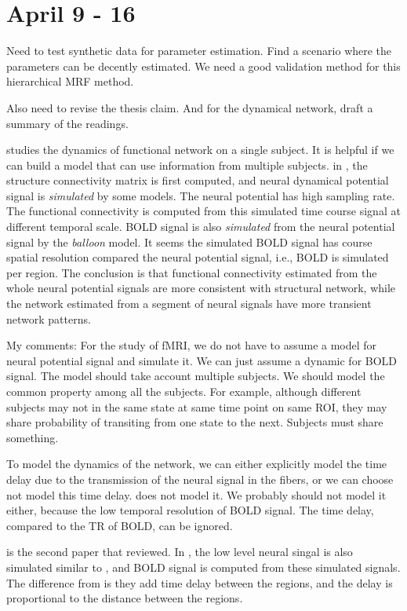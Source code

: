 \documentclass[12pt]{article}
\begin{document}
\section{April 9 - 16}
Need to test synthetic data for parameter estimation. Find a scenario where the
parameters can be decently estimated. We need a good validation method for this
hierarchical MRF method.

Also need to revise the thesis claim. And for the dynamical network, draft a summary of the readings. 

\citet{honey2007network} studies the dynamics of functional network on a single
subject. It is helpful if we can build a model that can use information from
multiple subjects. in \cite{honey2007network}, the structure connectivity matrix
is first computed, and neural dynamical potential signal is \emph{simulated} by
some models. The neural potential has high sampling rate. The functional
connectivity is computed from this simulated time course signal at different
temporal scale. BOLD signal is also \emph{simulated} from the neural potential
signal by the \emph{balloon} model. It seems the simulated BOLD signal has
course spatial resolution compared the neural potential signal, i.e., BOLD is
simulated per region. The conclusion is that functional connectivity estimated
from the whole neural potential signals are more consistent with structural
network, while the network estimated from a segment of neural signals have more
transient network patterns.

My comments: For the study of fMRI, we do not have to assume a model for neural
potential signal and simulate it. We can just assume a dynamic for BOLD
signal. The model should take account multiple subjects. We should model the
common property among all the subjects. For example, although different subjects
may not in the same state at same time point on same ROI, they may share
probability of transiting from one state to the next. Subjects must share
something.

To model the dynamics of the network, we can either explicitly model the time
delay due to the transmission of the neural signal in the fibers, or we can
choose not model this time delay. \cite{honey2007network} does not model it. We
probably should not model it either, because the low temporal resolution of BOLD
signal. The time delay, compared to the TR of BOLD, can be ignored.

\cite{ghosh2008noise} is the second paper that \citet{deco2010emerging}
reviewed. In \citeauthor{ghosh2008noise}, the low level neural singal is also
simulated similar to \citeauthor{honey2007network}, and BOLD signal is computed
from these simulated signals. The difference from \citeauthor{honey2007network}
is they add time delay between the regions, and the delay is proportional to the
distance between the regions.
\end{document}
